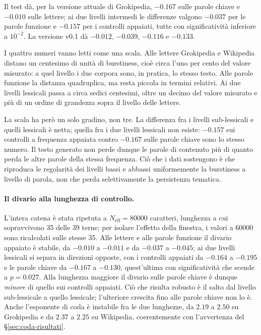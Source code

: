 Il test dà, per la versione attuale di Grokipedia,
$-0.167$ sulle parole chiave e $-0.010$ sulle lettere; ai due livelli intermedi
le differenze valgono $-0.037$ per le parole funzione e $-0.157$ per i controlli
appaiati, tutte con significatività inferiore a $10^{-2}$. La versione v0.1 dà
$-0.012$, $-0.039$, $-0.116$ e $-0.133$.

I quattro numeri vanno letti come una scala. Alle lettere Grokipedia e
Wikipedia distano un centesimo di unità di burstiness, cioè circa l'uno per
cento del valore misurato: a quel livello i due corpora sono, in pratica, lo
stesso testo. Alle parole funzione la distanza quadruplica, ma resta piccola in
termini relativi. Ai due livelli lessicali passa a circa sedici centesimi, oltre
un decimo del valore misurato e più di un ordine di grandezza sopra il livello
delle lettere.

La scala ha però un solo gradino, non tre. La differenza fra i livelli
sub-lessicali e quelli lessicali è netta; quella fra i due livelli lessicali non
esiste: $-0.157$ sui controlli a frequenza appaiata contro $-0.167$ sulle parole
chiave sono lo stesso numero. Il testo generato non perde dunque le parole di
contenuto più di quanto perda le altre parole della stessa frequenza. Ciò che i
dati sostengono è che riproduca le regolarità dei livelli bassi e abbassi
uniformemente la burstiness a livello di parola, non che perda selettivamente la
persistenza tematica.

\paragraph{Il divario alla lunghezza di controllo.}
\label{sec:robustezza-neff}
L'intera catena è stata ripetuta a $N_{\mathrm{eff}} = \num{80000}$ caratteri,
lunghezza a cui sopravvivono \num{35} delle \num{39} terne; per isolare
l'effetto della finestra, i valori a \num{60000} sono ricalcolati sulle stesse
\num{35}. Alle lettere e alle parole funzione il divario appaiato è stabile, da
$-0.010$ a $-0.011$ e da $-0.037$ a $-0.045$; ai due livelli lessicali si separa
in direzioni opposte, con i controlli appaiati da $-0.164$ a $-0.195$ e le parole
chiave da $-0.167$ a $-0.130$, quest'ultima con significatività che scende a
$p = 0.027$. Alla lunghezza maggiore il divario sulle parole chiave è dunque
\emph{minore} di quello sui controlli appaiati. Ciò che risulta robusto è il
salto dal livello sub-lessicale a quello lessicale; l'ulteriore crescita fino
alle parole chiave non lo è. Anche l'esponente di coda è instabile fra le due
lunghezze, da $2.19$ a $2.50$ su Grokipedia e da $2.37$ a $2.25$ su Wikipedia,
coerentemente con l'avvertenza del §\ref{sec:coda-risultati}.

